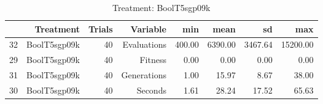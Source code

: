 \begin{table}[ht]
\centering
\begin{tabular}{rrrrrrrr}
  \hline
 & Treatment & Trials & Variable & min & mean & sd & max \\ 
  \hline
32 & BoolT5sgp09k &  40 & Evaluations & 400.00 & 6390.00 & 3467.64 & 15200.00 \\ 
  29 & BoolT5sgp09k &  40 & Fitness & 0.00 & 0.00 & 0.00 & 0.00 \\ 
  31 & BoolT5sgp09k &  40 & Generations & 1.00 & 15.97 & 8.67 & 38.00 \\ 
  30 & BoolT5sgp09k &  40 & Seconds & 1.61 & 28.24 & 17.52 & 65.63 \\ 
   \hline
\end{tabular}
\caption{Treatment: BoolT5sgp09k} 
\end{table}
